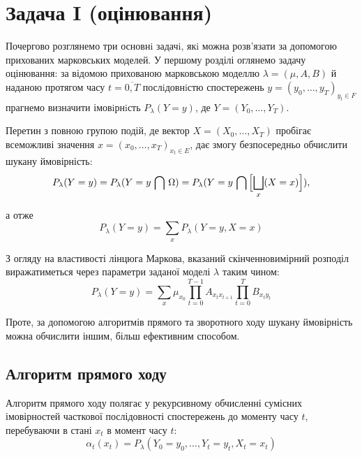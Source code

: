 \section{Задача I (оцінювання)}

Почергово розглянемо три основнi задачi, якi можна розв’язати за допомогою прихованих марковських моделей. У першому розділі оглянемо задачу оцінювання: за відомою прихованою марковською моделлю $\lambda=(\mu,A,B)$ й наданою протягом часу $t=\overline{0,T}$ послiдовнiстю спостережень $y=(y_0, \ldots , y_T)_{y_t\in F}$ прагнемо визначити імовiрнiсть $P_\lambda(Y = y)$, де $Y=(Y_0, \ldots , Y_T)$. 

Перетин з повною групою подій, де вектор $X=(X_0, \ldots , X_T)$ пробігає всеможливі значення $x=(x_0, \ldots , x_T)_{x_t\in E}$, дає змогу безпосередньо обчислити шукану ймовірність:
\begin{equation*}
    P_\lambda(Y = y)=P_\lambda(Y = y\, \bigcap\, \Omega)=P_\lambda(Y = y\, \bigcap\, \Bigl[\bigsqcup\limits_{x}(X=x)\Bigr]),
\end{equation*}

а отже
\begin{equation*}
    P_\lambda(Y = y)=\sum\limits_{x}P_\lambda(Y = y, X=x)
\end{equation*} 

З огляду на властивості лінцюга Маркова, вказаний скінченновимірний розподіл виражатиметься через параметри заданої моделі $\lambda$ таким чином:
\begin{equation*}
    P_\lambda(Y = y)=\sum\limits_{x}\mu_{x_0}\prod\limits_{t=0}^{T-1}A_{x_t x_{t+1}}\prod\limits_{t=0}^{T}B_{x_t y_t} 
\end{equation*}

Проте, за допомогою алгоритмів прямого та зворотного ходу шукану ймовірність можна обчислити іншим, більш ефективним способом. 

\subsection{Алгоритм прямого ходу}

Алгоритм прямого ходу полягає у рекурсивному обчисленні сумісних імовірностей часткової послідовності спостережень до моменту часу $t$, перебуваючи в стані $x_t$ в момент часу $t:$
\begin{equation}
    \alpha_t(x_t)=P_\lambda(Y_0=y_0,\ldots,Y_t=y_t,X_t=x_t) \label{formula: alpha}
\end{equation}

